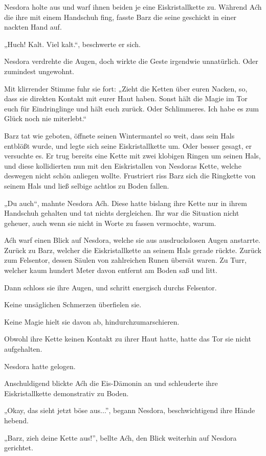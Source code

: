 Nesdora holte aus und warf ihnen beiden je eine Eiskristallkette zu. Während Aćh die ihre mit einem Handschuh fing, fasste Barz die seine geschickt in einer nackten Hand auf.

„Huch! Kalt. Viel kalt.“, beschwerte er sich.

Nesdora verdrehte die Augen, doch wirkte die Geste irgendwie unnatürlich. Oder zumindest ungewohnt.

Mit klirrender Stimme fuhr sie fort: „Zieht die Ketten über euren Nacken, so, dass sie direkten Kontakt mit eurer Haut haben. Sonst hält die Magie im Tor euch für Eindringlinge und hält euch zurück. Oder Schlimmeres. Ich habe es zum Glück noch nie miterlebt.“

Barz tat wie geboten, öffnete seinen Wintermantel so weit, dass sein Hals entblößt wurde, und legte sich seine Eiskristallkette um. Oder besser gesagt, er versuchte es. Er trug bereits eine Kette mit zwei klobigen Ringen um seinen Hals, und diese kollidierten nun mit den Eiskristallen von Nesdoras Kette, welche deswegen nicht schön anliegen wollte. Frustriert riss Barz sich die Ringkette von seinem Hals und ließ selbige achtlos zu Boden fallen.

„Du auch“, mahnte Nesdora Aćh. Diese hatte bislang ihre Kette nur in ihrem Handschuh gehalten und tat nichts dergleichen. Ihr war die Situation nicht geheuer, auch wenn sie nicht in Worte zu fassen vermochte, warum.

Aćh warf einen Blick auf Nesdora, welche sie aus ausdruckslosen Augen anstarrte. Zurück zu Barz, welcher die Eiskristallkette an seinem Hals gerade rückte. Zurück zum Felsentor, dessen Säulen von zahlreichen Runen übersät waren. Zu Turr, welcher kaum hundert Meter davon entfernt am Boden saß und litt.

Dann schloss sie ihre Augen, und schritt energisch durchs Felsentor.

Keine unsäglichen Schmerzen überfielen sie.

Keine Magie hielt sie davon ab, hindurchzumarschieren.

Obwohl ihre Kette keinen Kontakt zu ihrer Haut hatte, hatte das Tor sie nicht aufgehalten.

Nesdora hatte gelogen.

Anschuldigend blickte Aćh die Eis-Dämonin an und schleuderte ihre Eiskristallkette demonstrativ zu Boden.

„Okay, das sieht jetzt böse aus...”, begann Nesdora, beschwichtigend ihre Hände hebend.

„Barz, zieh deine Kette aus!”, bellte Aćh, den Blick weiterhin auf Nesdora gerichtet.

